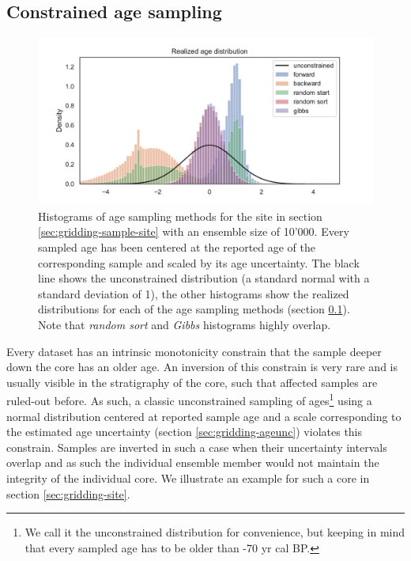 \begin{refsection}
\subsection{Constrained age sampling}  \label{sec:gridding-age-sampling}

\begin{figure}
	\includegraphics[width=\linewidth]{gridding-figures/age-sampling-methods-realized.pdf}
	\caption[Scaled histograms of age sampling methods]{Histograms of age sampling methods for the site in section \ref{sec:gridding-sample-site} with an ensemble size of 10'000. Every sampled age has been centered at the reported age of the corresponding sample and scaled by its age uncertainty. The black line shows the unconstrained distribution (a standard normal with a standard deviation of 1), the other histograms show the realized distributions for each of the age sampling methods (section \ref{sec:gridding-age-sampling}). Note that \textit{random sort} and \textit{Gibbs} histograms highly overlap.}
	\label{fig:gridding-age-sampling-methods}
\end{figure}

Every dataset has an intrinsic monotonicity constrain that the sample deeper down the core has an older age. An inversion of this constrain is very rare and is usually visible in the stratigraphy of the core, such that affected samples are ruled-out before. As such, a classic unconstrained sampling of ages\footnote{\label{foot:unconstrained-note}We call it the unconstrained distribution for convenience, but keeping in mind that every sampled age has to be older than -70 yr cal BP.} using a normal distribution centered at reported sample age and a scale corresponding to the estimated age uncertainty (section \ref{sec:gridding-ageunc}) violates this constrain. Samples are inverted in such a case when their uncertainty intervals overlap and as such the individual ensemble member would not maintain the integrity of the individual core. We illustrate an example for such a core in section \ref{sec:gridding-site}.


\end{refsection}
